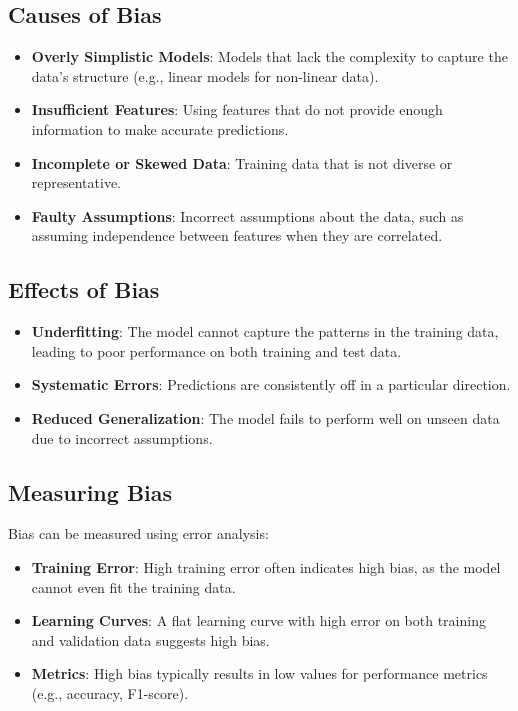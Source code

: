 \subsection*{Causes of Bias}
\begin{itemize}
    \item \textbf{Overly Simplistic Models}: Models that lack the complexity to capture the data's structure (e.g., linear models for non-linear data).
    \item \textbf{Insufficient Features}: Using features that do not provide enough information to make accurate predictions.
    \item \textbf{Incomplete or Skewed Data}: Training data that is not diverse or representative.
    \item \textbf{Faulty Assumptions}: Incorrect assumptions about the data, such as assuming independence between features when they are correlated.
\end{itemize}

\subsection*{Effects of Bias}
\begin{itemize}
    \item \textbf{Underfitting}: The model cannot capture the patterns in the training data, leading to poor performance on both training and test data.
    \item \textbf{Systematic Errors}: Predictions are consistently off in a particular direction.
    \item \textbf{Reduced Generalization}: The model fails to perform well on unseen data due to incorrect assumptions.
\end{itemize}

\subsection*{Measuring Bias}
Bias can be measured using error analysis:
\begin{itemize}
    \item \textbf{Training Error}: High training error often indicates high bias, as the model cannot even fit the training data.
    \item \textbf{Learning Curves}: A flat learning curve with high error on both training and validation data suggests high bias.
    \item \textbf{Metrics}: High bias typically results in low values for performance metrics (e.g., accuracy, F1-score).
\end{itemize}

